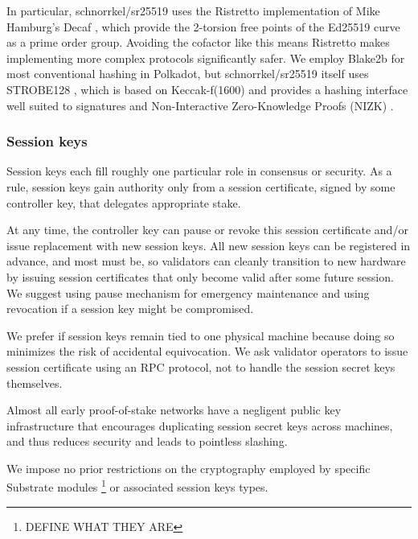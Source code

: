 In particular, schnorrkel/sr25519 uses the Ristretto implementation \cite{Ristretto} of Mike Hamburg's Decaf , which provide the 2-torsion free points of the Ed25519 curve as a prime order group.  Avoiding the cofactor like this means Ristretto makes implementing more complex protocols significantly safer.  We employ Blake2b for most conventional hashing in Polkadot, but schnorrkel/sr25519 itself uses STROBE128 \cite{STROBE}, which is based on Keccak-f(1600) and provides a hashing interface well suited to signatures and Non-Interactive Zero-Knowledge Proofs (NIZK) \cite{} \cite{}.

\subsubsection{Session keys}\label{sec:session_keys}

Session keys each fill roughly one particular role in consensus or security.  As a rule, session keys gain authority only from a session certificate, signed by some controller key, that delegates appropriate stake.  

At any time, the controller key can pause or revoke this session certificate and/or issue replacement with new session keys.  All new session keys can be registered in advance, and most must be, so validators can cleanly transition to new hardware by issuing session certificates that only become valid after some future session.  We suggest using pause mechanism for emergency maintenance and using revocation if a session key might be compromised.  

We prefer if session keys remain tied to one physical machine because doing so minimizes the risk of accidental equivocation.  We ask validator operators to issue session certificate using an RPC protocol, not to handle the session secret keys themselves.  

Almost all early proof-of-stake networks have a negligent public key infrastructure that encourages duplicating session secret keys across machines, and thus reduces security and leads to pointless slashing.

\smallskip

We impose no prior restrictions on the cryptography employed by specific Substrate modules \footnote{DEFINE WHAT THEY ARE} or associated session keys types.  

